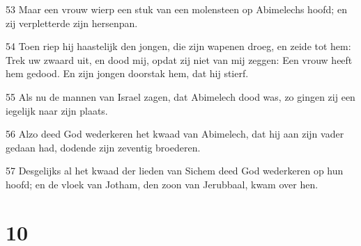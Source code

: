 \par 53 Maar een vrouw wierp een stuk van een molensteen op Abimelechs hoofd; en zij verpletterde zijn hersenpan.
\par 54 Toen riep hij haastelijk den jongen, die zijn wapenen droeg, en zeide tot hem: Trek uw zwaard uit, en dood mij, opdat zij niet van mij zeggen: Een vrouw heeft hem gedood. En zijn jongen doorstak hem, dat hij stierf.
\par 55 Als nu de mannen van Israel zagen, dat Abimelech dood was, zo gingen zij een iegelijk naar zijn plaats.
\par 56 Alzo deed God wederkeren het kwaad van Abimelech, dat hij aan zijn vader gedaan had, dodende zijn zeventig broederen.
\par 57 Desgelijks al het kwaad der lieden van Sichem deed God wederkeren op hun hoofd; en de vloek van Jotham, den zoon van Jerubbaal, kwam over hen.

\chapter{10}

